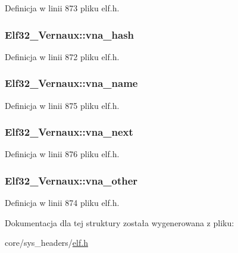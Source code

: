Definicja w linii 873 pliku elf.\-h.

\hypertarget{struct_elf32___vernaux_aeae097b35e2038c53eabb3fe3e0c7bf1}{
\subsubsection[{vna\-\_\-hash}]{ Elf32\-\_\-\-Vernaux\-::vna\-\_\-hash}}\label{struct_elf32___vernaux_aeae097b35e2038c53eabb3fe3e0c7bf1}


Definicja w linii 872 pliku elf.\-h.

\hypertarget{struct_elf32___vernaux_a8bf6007fe319d74753d03d0fa7977002}{
\subsubsection[{vna\-\_\-name}]{ Elf32\-\_\-\-Vernaux\-::vna\-\_\-name}}\label{struct_elf32___vernaux_a8bf6007fe319d74753d03d0fa7977002}


Definicja w linii 875 pliku elf.\-h.

\hypertarget{struct_elf32___vernaux_acff2104085a8a54ccbb16b0f00be5375}{
\subsubsection[{vna\-\_\-next}]{ Elf32\-\_\-\-Vernaux\-::vna\-\_\-next}}\label{struct_elf32___vernaux_acff2104085a8a54ccbb16b0f00be5375}


Definicja w linii 876 pliku elf.\-h.

\hypertarget{struct_elf32___vernaux_a28f6da095d6169a589ab3bad837258fc}{
\subsubsection[{vna\-\_\-other}]{ Elf32\-\_\-\-Vernaux\-::vna\-\_\-other}}\label{struct_elf32___vernaux_a28f6da095d6169a589ab3bad837258fc}


Definicja w linii 874 pliku elf.\-h.



Dokumentacja dla tej struktury została wygenerowana z pliku\-:\begin{DoxyCompactItemize}
\item 
core/sys\-\_\-headers/\hyperlink{elf_8h}{elf.\-h}\end{DoxyCompactItemize}
